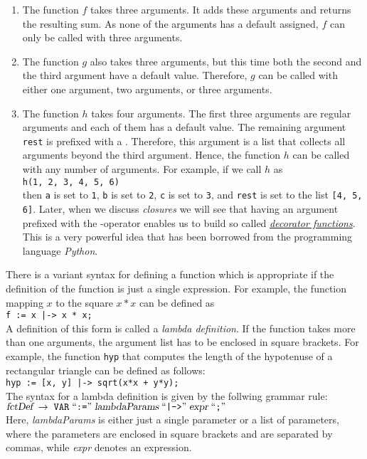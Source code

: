 \begin{enumerate}
\item The function $f$ takes three arguments.  It adds these arguments and returns the resulting
      sum.  As none of the arguments has a default assigned, $f$ can only be called with three arguments.
\item The function $g$ also takes three arguments, but this time both the second and the third
      argument have a default value.  Therefore, $g$ can be called with either one argument, two
      arguments, or three arguments.
\item The function $h$ takes four arguments.  The first three arguments are regular arguments and
      each of them has a default value.  The remaining argument \texttt{rest} is prefixed with a 
      \squoted{*}.  Therefore, this argument is a list that collects all arguments beyond the third
      argument.  Hence, the function $h$ can be called with any number of arguments.  For example,
      if we call $h$ as
      \\[0.2cm]
      \hspace*{1.3cm}
      \texttt{h(1, 2, 3, 4, 5, 6)}
      \\[0.2cm]
      then \texttt{a} is set to \texttt{1}, \texttt{b} is set to \texttt{2}, \texttt{c} is set to
      \texttt{3}, and \texttt{rest} is set to the list \texttt{[4, 5, 6]}.  Later, when we discuss
      \emph{closures} we will see that having an argument prefixed with the \squoted{*}-operator
      enables us to build so called 
      \href{http://en.wikipedia.org/wiki/Python_syntax_and_semantics#Decorators}{\emph{decorator functions}}.
      This is a very powerful idea that has been borrowed from the programming language \textsl{Python}.
\end{enumerate}
There is a variant syntax for defining a function which is appropriate if the definition of the
function is just a single expression.  For example, the function mapping $x$ to the square
$x*x$ can be defined as
\\[0.2cm]
\hspace*{1.3cm}
\texttt{f := x |-> x * x;}
\\[0.2cm]
A definition of this form is called a \emph{lambda definition}.
If the function takes more than one arguments, the argument list has to be enclosed in square
brackets.  For example, the function \texttt{hyp} that computes the length of the hypotenuse of a
rectangular triangle can be defined as follows:
\\[0.2cm]
\hspace*{1.3cm}
\texttt{hyp := [x, y] |-> sqrt(x*x + y*y);}
\\[0.2cm]
The syntax for a lambda definition is given by the follwing grammar rule:
\\[0.2cm]
\hspace*{1.3cm}
$\textsl{fctDef} \;\rightarrow\; \mathtt{VAR} \;\mbox{``\texttt{:=}''}\; \textsl{lambdaParams} \;\mbox{``\texttt{|->}''}\; \textsl{expr} \;\mbox{``\texttt{;}''}\;$
\\[0.2cm]
Here, \textsl{lambdaParams} is either just a single parameter or a list of parameters, where the
parameters are enclosed in square brackets and are separated by commas, while
\textsl{expr} denotes an expression.


